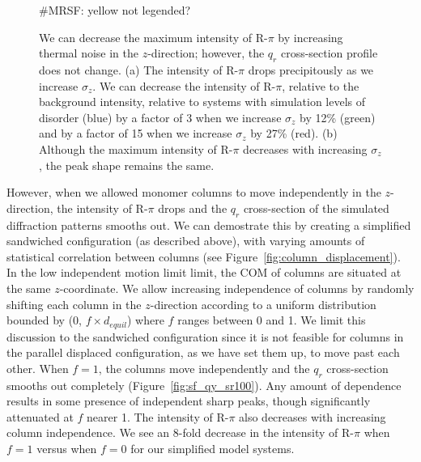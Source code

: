 \documentclass[journal=jpcbfk,manuscript=article]{achemso}
\begin{document}
\begin{figure}[!htb]
\begin{subfigure}{0.49\textwidth}
  \caption{}\label{fig:rpi_xsection_vs_zsigma}
  \end{subfigure}
  #MRSF: yellow not legended?
  \caption{We can decrease the maximum intensity of R-$\pi$ by increasing
  thermal noise in the $z$-direction; however, the $q_r$ cross-section profile does
  not change. (a) The intensity of R-$\pi$ drops precipitously as we increase
  $\sigma_z$. We can decrease the intensity of R-$\pi$, relative to the
  background intensity, relative to systems with simulation levels of disorder (blue)
  by a factor of 3 when we
  increase $\sigma_z$ by 12\% (green) and by a factor of 15 when we increase
  $\sigma_z$ by 27\% (red). (b) Although the maximum intensity of R-$\pi$
  decreases with increasing $\sigma_z$, the peak shape remains the same.}\label{fig:znoise}
  \end{figure}
  
  However, when we allowed monomer columns to move independently in the
  $z$-direction, the intensity of R-$\pi$ drops and the $q_r$ cross-section of
  the simulated diffraction patterns smooths out. We can demostrate this by
  creating a simplified sandwiched configuration (as described above), 
  with varying amounts of statistical correlation between columns (see Figure~\ref{fig:column_displacement}). In the low independent motion limit
  limit, the COM of columns are situated at the same $z$-coordinate.
  We allow increasing independence of columns by randomly shifting each column in
  the $z$-direction according to a uniform distribution bounded by (0, $f \times
  \mathit{d}_{equil}$) where $f$ ranges between 0 and 1. We limit this discussion
  to the sandwiched configuration since it is not feasible for columns in the
  parallel displaced configuration, as we have set them up, to move past each
  other. When $f = 1$, the columns move independently and the $q_r$ cross-section
  smooths out completely (Figure~\ref{fig:sf_qy_sr100}). Any amount of
  dependence results in some presence of independent sharp peaks, though
  significantly attenuated at $f$ nearer 1. The intensity of R-$\pi$ also
  decreases with increasing column independence. We see an 8-fold decrease in the
  intensity of R-$\pi$ when $f=1$ versus when $f=0$ for our simplified model
  systems.
\end{document}
